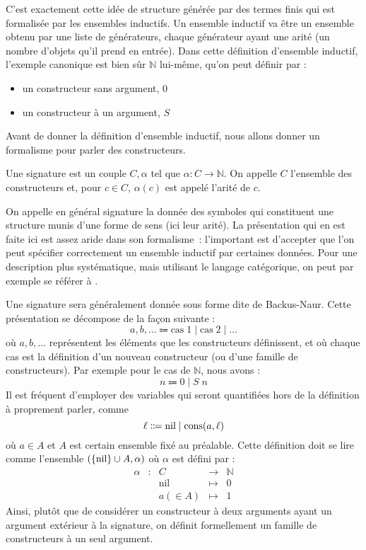 C'est exactement cette idée de structure générée par des termes finis qui est
formalisée par les ensembles inductifs. Un ensemble inductif va être un ensemble
obtenu par une liste de générateurs, chaque générateur ayant une arité (un
nombre d'objets qu'il prend en entrée). Dans cette définition d'ensemble
inductif, l'exemple canonique est bien sûr $\mathbb N$ lui-même, qu'on peut
définir par :
\begin{itemize}
\item un constructeur sans argument, $0$
\item un constructeur à un argument, $S$
\end{itemize}

Avant de donner la définition d'ensemble inductif, nous allons donner un
formalisme pour parler des constructeurs.

\begin{definition}[Signature]
  Une signature est un couple $C,\alpha$ tel que $\alpha : C \to \mathbb N$.
  On appelle $C$ l'ensemble des constructeurs et, pour $c \in C$, $\alpha(c)$
  est appelé l'arité de $c$.
\end{definition}

On appelle en général signature la donnée des symboles qui constituent une
structure munis d'une forme de sens (ici leur arité). La présentation qui en est
faite ici est assez aride dans son formalisme~: l'important est d'accepter que
l'on peut spécifier correctement un ensemble inductif par certaines données.
Pour une description plus systématique, mais utilisant le langage catégorique,
on peut par exemple se référer à \cite{JacobsCLTT}.

Une signature sera généralement donnée sous forme dite de Backus-Naur. Cette
présentation se décompose de la façon suivante :
\[a,b,\ldots \Coloneq \mathrm{cas}\;1 \mid \mathrm{cas}\;2 \mid \ldots\]
où $a,b,\ldots$ représentent les éléments que les constructeurs définissent,
et où chaque cas est la définition d'un nouveau constructeur (ou d'une famille
de constructeurs). Par exemple pour le cas de $\mathbb N$, nous avons :
\[n \Coloneq 0 \mid S\;n\]
Il est fréquent d'employer des variables qui seront quantifiées hors de la
définition à proprement parler, comme
\[\ell \Coloneq \nil \mid \cons(a,\ell)\]
où $a \in A$ et $A$ est certain ensemble fixé au préalable. Cette définition
doit se lire comme l'ensemble $(\{\operatorname{nil}\} \cup A,\alpha)$ où $\alpha$
est défini par :
\[
\begin{array}{rcccl}
  \alpha &:& C & \longrightarrow & \mathbb N\\
  & & \mathrm{nil} & \longmapsto & 0 \\
  & & a (\in A) & \longmapsto & 1
\end{array}
\]
Ainsi, plutôt que de considérer un constructeur à deux arguments ayant un
argument extérieur à la signature, on définit formellement un famille de
constructeurs à un seul argument.


